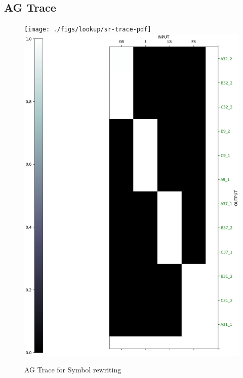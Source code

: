 \subsection{AG Trace}
\begin{figure}
	\begin{minipage}[t]{\textwidth}
		\ifpdf
		\texttt{[image: ./figs/lookup/sr-trace-pdf]}
		\else
		\includegraphics[width=\linewidth,keepaspectratio=true]{./figs/lookup/sr-trace-eps}
		\fi
		\caption{AG Trace for Symbol rewriting}
		\label{lt_sr_trace}
	\end{minipage}
\end{figure}
